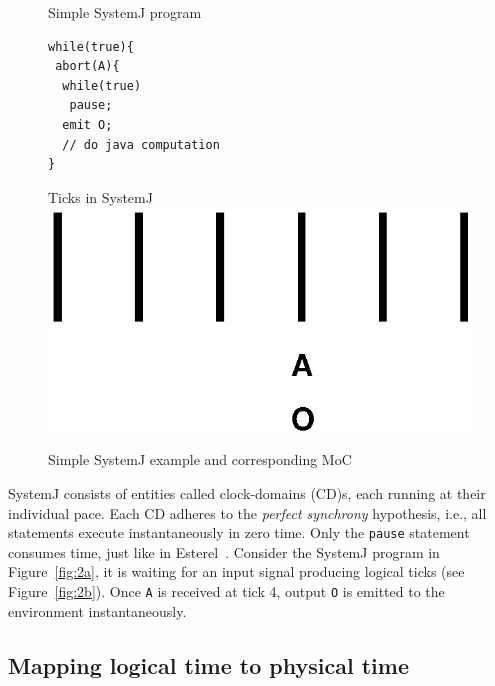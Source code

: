 \begin{figure}[bth]
\centering
\begin{SubFloat}{\label{fig:2a}Simple SystemJ program}%
\begin{minipage}[b]{0.3\linewidth}%
\begin{verbatim}
while(true){
 abort(A){
  while(true)
   pause;
  emit O;
  // do java computation
}
\end{verbatim}%
\end{minipage}%
\end{SubFloat}
\hspace{1.5cm}%
\begin{SubFloat}{\label{fig:2b}Ticks in SystemJ}%
\includegraphics[scale=0.5]{moc}
\end{SubFloat}%
\caption{Simple SystemJ example and corresponding MoC}
\label{fig:2}
\end{figure}

SystemJ consists of entities called clock-domains (CD)s, each running at
their individual pace. Each CD adheres to the \textit{perfect synchrony}
hypothesis, i.e., all statements execute instantaneously in zero
time. Only the \texttt{pause} statement consumes time, just like in
Esterel~\cite{gber931}. Consider the SystemJ program in
Figure~\ref{fig:2a}, it is waiting for an input signal producing logical
ticks (see Figure~\ref{fig:2b}). Once \texttt{A} is received at tick 4,
output \texttt{O} is emitted to the environment instantaneously.

\subsection{Mapping logical time to physical time}
\label{sec:mapping-logical-time}

